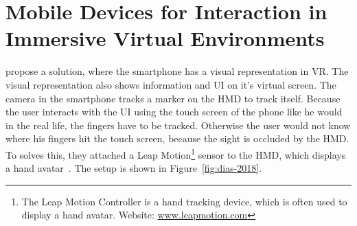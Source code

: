 \section{Mobile Devices for Interaction in Immersive Virtual Environments}\label{section:mobile-devices-interaction-ve}
\citeauthor{Dias.2018} propose a solution, where the smartphone has a visual representation in \ac{VR}. The visual representation also shows information and \ac{UI} on it's virtual screen. The camera in the smartphone tracks a marker on the \ac{HMD} to track itself. Because the user interacts with the \ac{UI} using the touch screen of the phone like he would in the real life, the fingers have to be tracked. Otherwise the user would not know where his fingers hit the touch screen, because the sight is occluded by the \ac{HMD}. To solves this, they attached a Leap Motion\footnote{The Leap Motion Controller is a hand tracking device, which is often used to display a hand avatar. Website: \href{https://www.leapmotion.com/}{www.leapmotion.com}} sensor to the \ac{HMD}, which displays a hand avatar~\cite{Dias.2018}. The setup is shown in Figure~\ref{fig:dias-2018}. 

